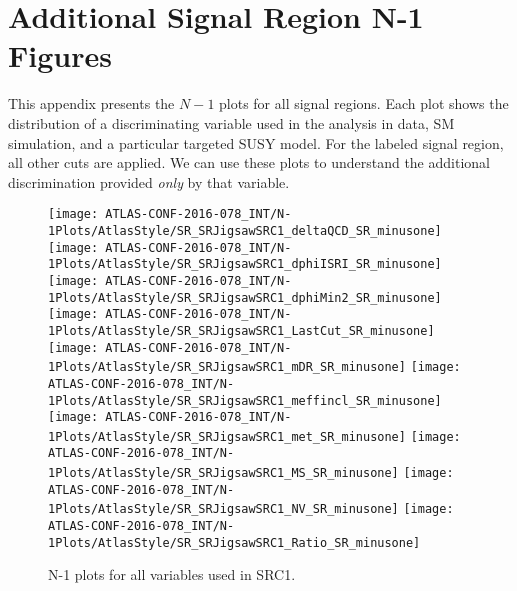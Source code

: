 

\chapter{Additional Signal Region N-1 Figures}
\label{app:n-1_plots}

This appendix presents the $N-1$ plots for all signal regions.
Each plot shows the distribution of a discriminating variable used in the analysis in data, SM simulation, and a particular targeted SUSY model.
For the labeled signal region, all other cuts are applied.
We can use these plots to understand the additional discrimination provided \textit{only} by that variable.

\begin{figure}[tbp]
\begin{center}
\texttt{[image: ATLAS-CONF-2016-078\_INT/N-1Plots/AtlasStyle/SR\_SRJigsawSRC1\_deltaQCD\_SR\_minusone]}
\texttt{[image: ATLAS-CONF-2016-078\_INT/N-1Plots/AtlasStyle/SR\_SRJigsawSRC1\_dphiISRI\_SR\_minusone]}
\texttt{[image: ATLAS-CONF-2016-078\_INT/N-1Plots/AtlasStyle/SR\_SRJigsawSRC1\_dphiMin2\_SR\_minusone]}
\texttt{[image: ATLAS-CONF-2016-078\_INT/N-1Plots/AtlasStyle/SR\_SRJigsawSRC1\_LastCut\_SR\_minusone]}
\texttt{[image: ATLAS-CONF-2016-078\_INT/N-1Plots/AtlasStyle/SR\_SRJigsawSRC1\_mDR\_SR\_minusone]}
\texttt{[image: ATLAS-CONF-2016-078\_INT/N-1Plots/AtlasStyle/SR\_SRJigsawSRC1\_meffincl\_SR\_minusone]}
\texttt{[image: ATLAS-CONF-2016-078\_INT/N-1Plots/AtlasStyle/SR\_SRJigsawSRC1\_met\_SR\_minusone]}
\texttt{[image: ATLAS-CONF-2016-078\_INT/N-1Plots/AtlasStyle/SR\_SRJigsawSRC1\_MS\_SR\_minusone]}
\texttt{[image: ATLAS-CONF-2016-078\_INT/N-1Plots/AtlasStyle/SR\_SRJigsawSRC1\_NV\_SR\_minusone]}
\texttt{[image: ATLAS-CONF-2016-078\_INT/N-1Plots/AtlasStyle/SR\_SRJigsawSRC1\_Ratio\_SR\_minusone]}
\end{center}
\caption{N-1 plots for all variables used in SRC1.}
\label{fig:SR_SRJigsawSRC1_deltaQCD_SR_minusone}
\end{figure}

